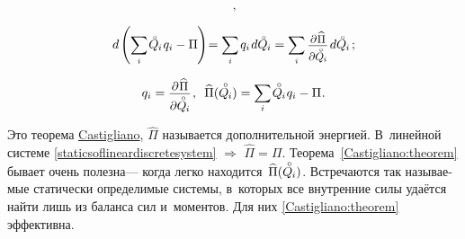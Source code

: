 \begin{otherlanguage}{russian}
\begin{equation*}
\begin{array}{c}
\hspace{.2ex} ,
\\[1em]
%
\small
d \hspace{-0.1ex} \left( \scalebox{0.95}[1]{$\displaystyle \sum_{\smash{i}}$} \hspace{.2ex} \mathcircabove{Q}_{\hspace{-0.1ex}i} \hspace{.2ex} q_i - \Pi \hspace{-0.1ex} \right) \hspace{-0.5ex}
= \scalebox{0.95}[1]{$\displaystyle \sum_{\smash{i}}$} \hspace{.32ex} q_i \hspace{.2ex} d\mathcircabove{Q}_{\hspace{-0.1ex}i}
= \scalebox{0.95}[1]{$\displaystyle \sum_{\smash{i}}$} \hspace{.4ex}
\scalebox{0.96}{$ \displaystyle \frac{\raisemath{-0.12em}{\partial \hspace{.1ex} \widehat{\Pi}}}{\raisemath{-0.4em}{\partial \mathcircabove{Q}_{\hspace{-0.1ex}i}}} $}
\hspace{.25ex} d\mathcircabove{Q}_{\hspace{-0.1ex}i}
%
\hspace{.33ex} ;
\end{array}\end{equation*}%

\nopagebreak\vspace{-0.33em}\begin{equation}\label{Castigliano:theorem}
q_i = \scalebox{0.96}{$ \displaystyle \frac{\raisemath{-0.12em}{\partial \hspace{.1ex} \widehat{\Pi}}}{\raisemath{-0.4em}{\partial \mathcircabove{Q}_{\hspace{-0.1ex}i}}} $} \hspace{.2ex} ,
\:\;
\widehat{\Pi}(\mathcircabove{Q}_{\hspace{-0.1ex}i})
= \scalebox{0.95}[1]{$\displaystyle \sum_{\smash{i}}$} \hspace{.2ex} \mathcircabove{Q}_{\hspace{-0.1ex}i} \hspace{.12ex} q_i - \Pi
\hspace{.1ex} .
\end{equation}

\vspace{-0.1em} \noindent Это теорема \href{https://en.wikipedia.org/wiki/Carlo_Alberto_Castigliano}{Castigliano}, $\widehat{\Pi}$ называется дополнительной энергией. В~линейной системе \eqref{staticsoflineardiscretesystem} ${\Rightarrow}$ ${\widehat{\Pi} = \Pi}$. Теорема~\eqref{Castigliano:theorem} бывает очень полезна\:--- когда легко находится~${\widehat{\Pi}(\mathcircabove{Q}_{\hspace{-0.1ex}i})}$. Встречаются так называемые статически определимые системы, в~которых все внутренние силы удаётся найти лишь из баланса сил и~моментов. Для них \eqref{Castigliano:theorem} эффективна.


\end{otherlanguage}
